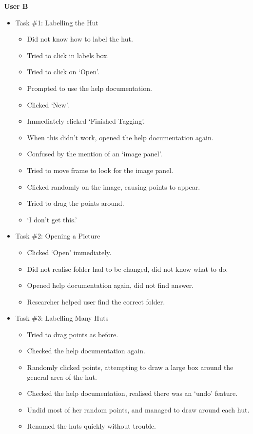 \documentclass[11pt,twocolumn]{article}
\begin{document}
\textbf{User B}
\begin{itemize}
\item Task \#1: Labelling the Hut
\begin{itemize}
\item Did not know how to label the hut.
\item Tried to click in labels box.
\item Tried to click on `Open'.
\item Prompted to use the help documentation. 
\item Clicked `New'.
\item Immediately clicked `Finished Tagging'.
\item When this didn't work, opened the help documentation again.
\item Confused by the mention of an `image panel'.
\item Tried to move frame to look for the image panel.
\item Clicked randomly on the image, causing points to appear.
\item Tried to drag the points around.
\item `I don't get this.'
\end{itemize}
\item Task \#2: Opening a Picture
\begin{itemize}
\item Clicked `Open' immediately. 
\item Did not realise folder had to be changed, did not know what to do.
\item Opened help documentation again, did not find answer.
\item Researcher helped user find the correct folder.
\end{itemize}
\item Task \#3: Labelling Many Huts
\begin{itemize}
\item Tried to drag points as before.
\item Checked the help documentation again.
\item Randomly clicked points, attempting to draw a large box around the general area of the hut.
\item Checked the help documentation, realised there was an `undo' feature.
\item Undid most of her random points, and managed to draw around each hut.
\item Renamed the huts quickly without trouble.
\end{itemize}

\end{itemize}
\end{document}
